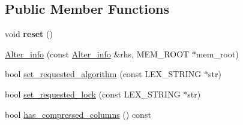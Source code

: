 \subsection*{Public Member Functions}
\begin{DoxyCompactItemize}
\item 
\mbox{\label{classAlter__info_a579ae4060f2b43170a4677f568745b76}} 
void {\bfseries reset} ()
\item 
\mbox{\hyperlink{classAlter__info_a29143ad6c3785957b694487bcb37dccc}{Alter\+\_\+info}} (const \mbox{\hyperlink{classAlter__info}{Alter\+\_\+info}} \&rhs, M\+E\+M\+\_\+\+R\+O\+OT $\ast$mem\+\_\+root)
\item 
bool \mbox{\hyperlink{classAlter__info_a5d721db444541bf1ef0e0ed218976d75}{set\+\_\+requested\+\_\+algorithm}} (const L\+E\+X\+\_\+\+S\+T\+R\+I\+NG $\ast$str)
\item 
bool \mbox{\hyperlink{classAlter__info_a1099c6e4fdc5090644593b0b1b8ba632}{set\+\_\+requested\+\_\+lock}} (const L\+E\+X\+\_\+\+S\+T\+R\+I\+NG $\ast$str)
\item 
bool \mbox{\hyperlink{classAlter__info_a9b969540dfb6e102317110171387b467}{has\+\_\+compressed\+\_\+columns}} () const
\end{DoxyCompactItemize}
